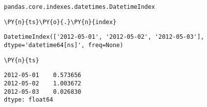             \begin{tcolorbox}[breakable, size=fbox, boxrule=.5pt, pad at break*=1mm, opacityfill=0]
\begin{Verbatim}[commandchars=\\\{\}]
pandas.core.indexes.datetimes.DatetimeIndex
\end{Verbatim}
\end{tcolorbox}
        
    \begin{tcolorbox}[breakable, size=fbox, boxrule=1pt, pad at break*=1mm,colback=cellbackground, colframe=cellborder]
\begin{Verbatim}[commandchars=\\\{\}]
\PY{n}{ts}\PY{o}{.}\PY{n}{index}
\end{Verbatim}
\end{tcolorbox}

            \begin{tcolorbox}[breakable, size=fbox, boxrule=.5pt, pad at break*=1mm, opacityfill=0]
\begin{Verbatim}[commandchars=\\\{\}]
DatetimeIndex(['2012-05-01', '2012-05-02', '2012-05-03'],
dtype='datetime64[ns]', freq=None)
\end{Verbatim}
\end{tcolorbox}
        
    \begin{tcolorbox}[breakable, size=fbox, boxrule=1pt, pad at break*=1mm,colback=cellbackground, colframe=cellborder]
\begin{Verbatim}[commandchars=\\\{\}]
\PY{n}{ts}
\end{Verbatim}
\end{tcolorbox}

            \begin{tcolorbox}[breakable, size=fbox, boxrule=.5pt, pad at break*=1mm, opacityfill=0]
\begin{Verbatim}[commandchars=\\\{\}]
2012-05-01    0.573656
2012-05-02    1.003672
2012-05-03    0.026830
dtype: float64
\end{Verbatim}
\end{tcolorbox}
        

